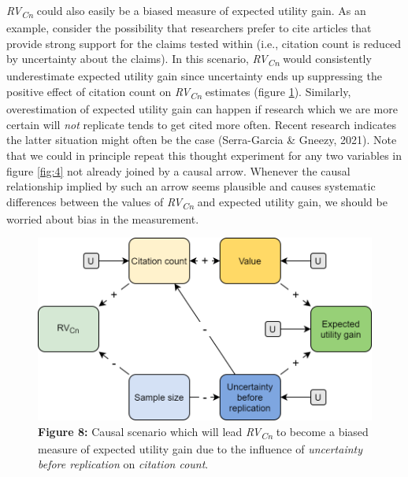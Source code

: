 \documentclass[
  english,
  jou,floatsintext]{apa6}
\begin{document}
\emph{RV\textsubscript{Cn}} could also easily be a biased measure of expected utility gain. As an example, consider the possibility that researchers prefer to cite articles that provide strong support for the claims tested within (i.e., citation count is reduced by uncertainty about the claims). In this scenario, \emph{RV\textsubscript{Cn}} would consistently underestimate expected utility gain since uncertainty ends up suppressing the positive effect of citation count on \emph{RV\textsubscript{Cn}} estimates (figure \ref{fig:8}). Similarly, overestimation of expected utility gain can happen if research which we are more certain will \emph{not} replicate tends to get cited more often. Recent research indicates the latter situation might often be the case (Serra-Garcia \& Gneezy, 2021). Note that we could in principle repeat this thought experiment for any two variables in figure \ref{fig:4} not already joined by a causal arrow. Whenever the causal relationship implied by such an arrow seems plausible and causes systematic differences between the values of \emph{RV\textsubscript{Cn}} and expected utility gain, we should be worried about bias in the measurement.

\begin{figure}
\centering
\includegraphics{figure_8.png}
\caption{\textbf{Figure 8:} Causal scenario which will lead \emph{RV\textsubscript{Cn}} to become a biased measure of expected utility gain due to the influence of \emph{uncertainty before replication} on \emph{citation count}. \label{fig:8}}
\end{figure}
\end{document}

